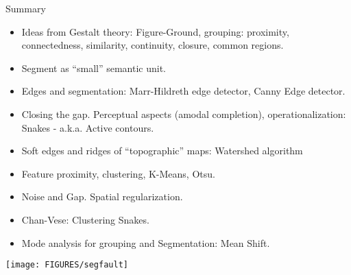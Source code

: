 \documentclass[9pt]{beamer}
\begin{document}
\begin{frame}[t]{Summary}
  \begin{center}
    {\fontsize{8}{6}\selectfont
      \begin{itemize}
      \item Ideas from Gestalt theory: Figure-Ground, grouping: proximity, connectedness, similarity, 
        continuity, closure, common regions.
      \item Segment as ``small'' semantic unit.
      \item Edges and segmentation: Marr-Hildreth edge detector, Canny Edge detector.
      \item Closing the gap. Perceptual aspects (amodal completion), operationalization: Snakes - a.k.a. Active contours.
      \item Soft edges and ridges of ``topographic'' maps: Watershed algorithm 
      \item Feature proximity, clustering, K-Means, Otsu.
      \item Noise and Gap. Spatial regularization.
      \item Chan-Vese: Clustering Snakes.
      \item Mode analysis for grouping and Segmentation: Mean Shift.
      \end{itemize}
    }
    \end{center}
\end{frame}


\begin{frame}
  \vfill
  \begin{center}
    \texttt{[image: FIGURES/segfault]}
  \end{center}
  \vfill
\end{frame}
\end{document}
